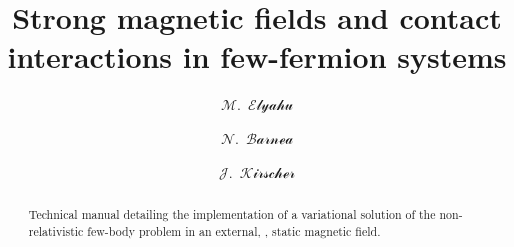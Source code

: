 \documentclass[aps,prd,onecolumn
,tightenlines,letterpaper,notitlepage,
nofootinbib]{revtex4-1}
\begin{document}
\newcommand{\rgm}{$\mathbb{R}$GM}
\newcommand{\bra}[1] {\left\langle~#1~\right|}
\newcommand{\ket}[1] {\left|~#1~\right\rangle}
\newcommand{\overlap}[2] {\left\langle~#1~\left|~#2~\right.\right\rangle}
\newcommand{\me}[3] {\left\langle~#1~\left|~#2~\left|~#3~\right.\right.\right\rangle}
\newcommand{\lam}[1]{$\Lambda=#1~$fm$^{-1}$}
\newcommand{\parg}[1] {\paragraph*{-\,\textit{#1}\,-}}
\newcommand{\nopi}{\pi\hspace{-6pt}/}
\newcommand{\ve}[1]{\ensuremath{\boldsymbol{#1}}}
\newcommand{\xvec}{\bs{x}}
\newcommand{\rvec}{\bs{r}}
\newcommand{\sgve}{\ensuremath{\boldsymbol{\sigma}}}
\newcommand{\tave}{\ensuremath{\boldsymbol{\tau}}}
\newcommand{\na}{\nabla}
\newcommand{\sumin}{\sum\limits_{i=1}^\texttt{N}}
\newcommand{\sumijn}{\sum\limits_{i<j}^\texttt{N}}
\newcommand{\sumijk}{\sum\limits_\text{cyc.}\sum\limits_{i<j<k}}
\newcommand{\prodcart}{\prod\limits_{c=x,y,z}}
\newcommand{\tx}{\tilde{x}}
\newcommand{\eftnopi}{\mbox{EFT($\slashed{\pi}$)}}

\newcommand{\cmment}[2]{\paragraph*{Ecce: #1}\texttt{\textcolor{blue}{#2}}}



\author{$\mathcal{M}$.~$\mathcal{Elyahu}$}
\author{$\mathcal{N}$.~$\mathcal{Barnea}$}
\author{$\mathcal{J}$.~$\mathcal{Kirscher}$}

\title{
Strong magnetic fields and contact interactions in few-fermion systems
} 

\begin{abstract}
Technical manual detailing the implementation of a variational solution of the non-relativistic few-body
problem in an external, \ie, static magnetic field.
\end{abstract}

\pacs{}

\maketitle
\end{document}
